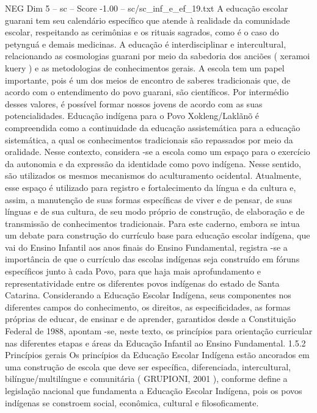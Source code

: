 \begin{textsample}{NEG Dim 5 – sc – Score -1.00 – sc/sc\_inf\_e\_ef\_19.txt}
A educação escolar guarani tem seu calendário específico que atende à realidade da comunidade escolar, respeitando as cerimônias e os rituais sagrados, como é o caso do petynguá e demais medicinas.
A educação é interdisciplinar e intercultural, relacionando as cosmologias guarani por meio da sabedoria dos anciões ( xeramoi kuery ) e as metodologias de conhecimentos gerais.
A escola tem um papel importante, pois é um dos meios de encontro de saberes tradicionais que, de acordo com o entendimento do povo guarani, são científicos.
Por intermédio desses valores, é possível formar nossos jovens de acordo com as suas potencialidades.
Educação indígena para o Povo Xokleng/Laklãnõ é compreendida como a continuidade da educação assistemática para a educação sistemática, a qual os conhecimentos tradicionais são repassados por meio da oralidade.
Nesse contexto, considera -se a escola como um espaço para o exercício da autonomia e da expressão da identidade como povo indígena.
Nesse sentido, são utilizados os mesmos mecanismos do aculturamento ocidental.
Atualmente, esse espaço é utilizado para registro e fortalecimento da língua e da cultura e, assim, a manutenção de suas formas específicas de viver e de pensar, de suas línguas e de sua cultura, de seu modo próprio de construção, de elaboração e de transmissão de conhecimentos tradicionais.
Para este caderno, embora se intua um debate para construção do currículo base para educação escolar indígena, que vai do Ensino Infantil aos anos finais do Ensino Fundamental, registra -se a importância de que o currículo das escolas indígenas seja construído em fóruns específicos junto à cada Povo, para que haja mais aprofundamento e representatividade entre os diferentes povos indígenas do estado de Santa Catarina.
Considerando a Educação Escolar Indígena, seus componentes nos diferentes campos do conhecimento, os direitos, as especificidades, as formas próprias de educar, de ensinar e de aprender, garantidos desde a Constituição Federal de 1988, apontam -se, neste texto, os princípios para orientação curricular nas diferentes etapas e áreas da Educação Infantil ao Ensino Fundamental. 1.5.2 Princípios gerais Os princípios da Educação Escolar Indígena estão ancorados em uma construção de escola que deve ser específica, diferenciada, intercultural, bilíngue/multilíngue e comunitária ( GRUPIONI, 2001 ), conforme define a legislação nacional que fundamenta a Educação Escolar Indígena, pois os povos indígenas se constroem social, econômica, cultural e filosoficamente.

\end{textsample}
